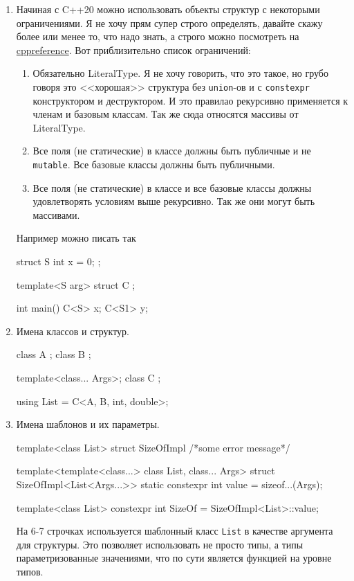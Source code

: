 \begin{enumerate}
\item Начиная с C++20 можно использовать объекты структур с некоторыми ограничениями.
Я не хочу прям супер строго определять, давайте скажу более или менее то, что надо знать, а строго можно посмотреть на \href{https://en.cppreference.com/w/cpp/language/template_parameters.html#Constant_template_parameter}{cppreference}.
Вот приблизительно список ограничений:
\begin{enumerate}
\item Обязательно LiteralType.
Я не хочу говорить, что это такое, но грубо говоря это <<хорошая>> структура без \verb"union"-ов и с \verb"constexpr" конструктором и деструктором.
И это правилао рекурсивно применяется к членам и базовым классам.
Так же сюда относятся массивы от LiteralType.

\item Все поля (не статические) в классе должны быть публичные и не \verb"mutable".
Все базовые классы должны быть публичными.

\item Все поля (не статические) в классе  и все базовые классы должны удовлетворять условиям выше рекурсивно.
Так же они могут быть массивами.
\end{enumerate}
Например можно писать так
\begin{cppcode}
struct S {
  int x = 0;
};

template<S arg>
struct C {};

int main() {
  C<S{}> x;
  C<S{1}> y;
}
\end{cppcode}

\item Имена классов и структур.
\begin{cppcode}
class A {};
class B {};

template<class... Args>;
class C {};

using List = C<A, B, int, double>;
\end{cppcode}

\item Имена шаблонов и их параметры.
\begin{cppcode}
template<class List>
struct SizeOfImpl {
  /*some error message*/
}

template<template<class...> class List, class... Args>
struct SizeOfImpl<List<Args...>> {
  static constexpr int value = sizeof...(Args);
}

template<class List>
constexpr int SizeOf = SizeOfImpl<List>::value;
\end{cppcode}
На 6-7 строчках используется шаблонный класс \verb"List" в качестве аргумента для структуры.
Это позволяет использовать не просто типы, а типы параметризованные значениями, что по сути является функцией на уровне типов.
\end{enumerate}


